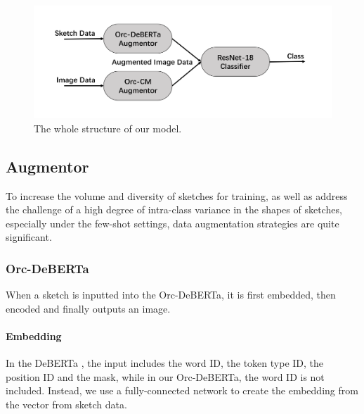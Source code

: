\documentclass{article}
\begin{document}
\begin{figure}[h]
	\centering
	\includegraphics[width=0.75\linewidth]{../Graph/whole.png}
	\caption{The whole structure of our model.}
	\label{fig:whole}
\end{figure}

\subsection{Augmentor}
To increase the volume and diversity of sketches for training, as well as address the challenge of a high degree of intra-class variance in the shapes of sketches, especially under the few-shot settings, data augmentation strategies are quite significant. 


\subsubsection{Orc-DeBERTa}

When a sketch is inputted into the Orc-DeBERTa, it is first embedded, then encoded and finally outputs an image.

\paragraph{Embedding}
In the DeBERTa \citep{Package}, the input includes the word ID,  the token type ID, the position ID and the mask, while in our Orc-DeBERTa, the word ID is not included. Instead, we use a fully-connected network to create the embedding from the vector from sketch data.
\end{document}
